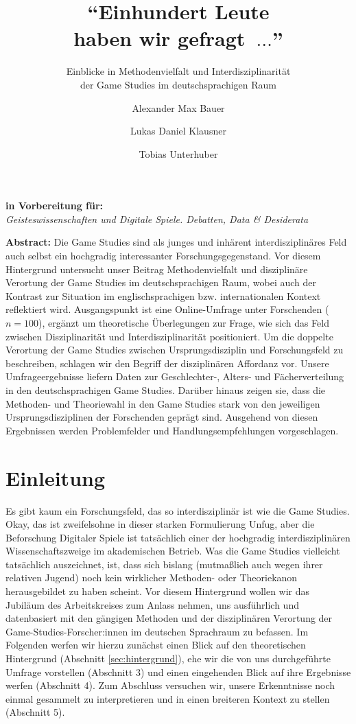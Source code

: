 \documentclass{scrartcl}
\title{\enquote{Einhundert Leute\\haben wir gefragt~$\ldots$}}
\subtitle{Einblicke in Methodenvielfalt und Interdisziplinarität\\der Game Studies im deutschsprachigen Raum}
\author[1]{Alexander Max Bauer}
\author[2]{Lukas Daniel Klausner}
\author[3]{Tobias Unterhuber}
\affil[1]{ Carl von Ossietzky Universität Oldenburg, Institut für Philosophie}
\affil[2]{ Fachhochschule St. Pölten, Institut für IT Sicherheitsforschung}
\affil[3]{ Universität Innsbruck, Institut für Germanistik}
\date{}
\begin{document}
\maketitle
\thispagestyle{empty}

\begin{center}
   \textbf{\textsf{in Vorbereitung für:}}\\
   \textit{Geisteswissenschaften und Digitale Spiele. Debatten, Data \& Desiderata}
\end{center}

\vfill
\noindent\textbf{\textsf{Abstract:}}
Die Game Studies sind als junges und inhärent interdisziplinäres Feld auch selbst ein hochgradig interessanter Forschungsgegenstand.
Vor diesem Hintergrund untersucht unser Beitrag Methodenvielfalt und disziplinäre Verortung der Game Studies im deutschsprachigen Raum, wobei auch der Kontrast zur Situation im englischsprachigen bzw. internationalen Kontext reflektiert wird.
Ausgangspunkt ist eine Online-Umfrage unter Forschenden ($n = 100$), ergänzt um theoretische Überlegungen zur Frage, wie sich das Feld zwischen Disziplinarität und Interdisziplinarität positioniert.
Um die doppelte Verortung der Game Studies zwischen Ursprungsdisziplin und Forschungsfeld zu beschreiben, schlagen wir den Begriff der disziplinären Affordanz vor.
Unsere Umfrageergebnisse liefern Daten zur Geschlechter-, Alters- und Fächerverteilung in den deutschsprachigen Game Studies.
Darüber hinaus zeigen sie, dass die Methoden- und Theoriewahl in den Game Studies stark von den jeweiligen Ursprungsdisziplinen der Forschenden geprägt sind.
Ausgehend von diesen Ergebnissen werden Problemfelder und Handlungsempfehlungen vorgeschlagen.


\newpage
\section{Einleitung}\label{sec:einleitung}
Es gibt kaum ein Forschungsfeld, das so interdisziplinär ist wie die Game Studies.
Okay, das ist zweifelsohne in dieser starken Formulierung Unfug, aber die Beforschung Digitaler Spiele ist tatsächlich einer der hochgradig interdisziplinären Wissenschaftszweige im akademischen Betrieb.
Was die Game Studies vielleicht tatsächlich auszeichnet, ist, dass sich bislang (mutmaßlich auch wegen ihrer relativen Jugend)\autocite[Vgl.][]{unterhuber_magic_2022} noch kein wirklicher Methoden- oder Theoriekanon herausgebildet zu haben scheint.
Vor diesem Hintergrund wollen wir das Jubiläum des Arbeitskreises zum Anlass nehmen, uns ausführlich und datenbasiert mit den gängigen Methoden und der disziplinären Verortung der Game-Studies-Forscher:innen im deutschen Sprachraum zu befassen.
Im Folgenden werfen wir hierzu zunächst einen Blick auf den theoretischen Hintergrund (Abschnitt \ref{sec:hintergrund}), ehe wir die von uns durchgeführte Umfrage vorstellen (Abschnitt 3) und einen eingehenden Blick auf ihre Ergebnisse werfen (Abschnitt 4).
Zum Abschluss versuchen wir, unsere Erkenntnisse noch einmal gesammelt zu interpretieren und in einen breiteren Kontext zu stellen (Abschnitt 5).
\end{document}
